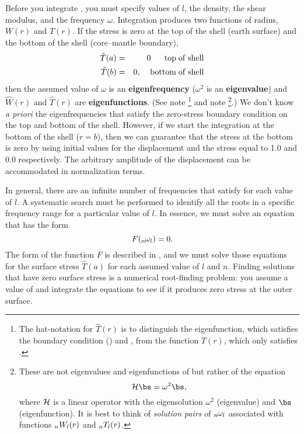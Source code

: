 \documentclass[11pt,titlepage,fleqn]{article}
\begin{document}
Before you integrate , you must specify values of $l$, the density, the shear modulus, and the frequency $\omega$. Integration produces two functions of radius, $W(r)$ and $T(r)$. If the stress is zero at the top of the shell (earth surface) and the bottom of the shell (core--mantle boundary),
%
\begin{eqnarray}
\hat{T}(a) &=& 0 \;\;\;\;\;\; {\rm top\;of\;shell}
\label{BC1}
\\
\hat{T}(b) &=& 0, \;\;\;\; {\rm bottom\;of\;shell}
\label{BC2}
\end{eqnarray}
%
then the assumed value of $\omega$ is an {\bf eigenfrequency} ($\omega^2$ is an {\bf eigenvalue}) and  $\hat{W}(r)$ and $\hat{T}(r)$ are {\bf eigenfunctions}.
(See note \footnote{The hat-notation for $\hat{T}(r)$ is to distinguish the eigenfunction, which satisfies the boundary condition () and , from the function $T(r)$, which only satisfies .} and note \footnote{These are not eigenvalues and eigenfunctions of  but rather of the equation \citep[][Eq.~4.8-4.9]{DT}
%
\begin{equation*}
{\boldmath \cal H} \bs = \omega^2 \bs,
\end{equation*}
%
where ${\boldmath \cal H}$ is a linear operator with the eigensolution $\omega^2$ (eigenvalue) and $\bs$ (eigenfunction). It is best to think of {\em solution pairs} of $\mbox{${}_{n\hspace{-0.2 mm}}\omega_l$}$ associated with functions $\mbox{${}_nW_l$}(r)$ and $\mbox{${}_nT_l$}(r)$.}.)
We don't know {\em a priori} the eigenfrequencies that satisfy the zero-stress boundary condition on the top and bottom of the shell. However, if we start the integration at the bottom of the shell ($r = b$), then we can guarantee that the stress at the bottom is zero by using initial values for the displacement and the stress equal to 1.0 and 0.0 respectively. The arbitrary amplitude of the displacement can be accommodated in normalization terms.

In general, there are an infinite number of frequencies that satisfy  for each value of $l$. A systematic search must be performed to identify all the roots in a specific frequency range for a particular value of $l$. In essence, we must solve an equation that has the form
%
\begin{equation}
F(\mbox{${}_{n\hspace{-0.2 mm}}\omega_l$}) = 0.
\end{equation}
%
The form of the function $F$ is described in , and we must solve those equations for the surface stress $\hat{T}(a)$ for each assumed value of $l$ and $n$. Finding solutions that have zero surface stress is a numerical root-finding problem: you assume a value of and integrate the equations to see if it produces zero stress at the outer surface.
\end{document}
